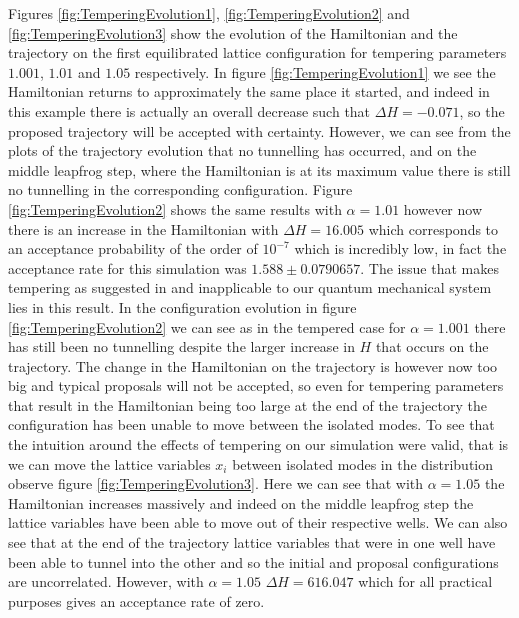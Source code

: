\documentclass[12pt]{article}
\begin{document}
Figures \ref{fig:TemperingEvolution1}, \ref{fig:TemperingEvolution2} and \ref{fig:TemperingEvolution3} show the evolution of the Hamiltonian and the trajectory on the first equilibrated lattice configuration for tempering parameters $1.001$, $1.01$ and $1.05$ respectively. In figure \ref{fig:TemperingEvolution1} we see the Hamiltonian returns to approximately the same place it started, and indeed in this example there is actually an overall decrease such that $\Delta H = -0.071$, so the proposed trajectory will be accepted with certainty. However, we can see from the plots of the trajectory evolution that no tunnelling has occurred, and on the middle leapfrog step, where the Hamiltonian is at its maximum value there is still no tunnelling in the corresponding configuration. Figure \ref{fig:TemperingEvolution2} shows the same results with $\alpha=1.01$ however now there is an increase in the Hamiltonian with $\Delta H = 16.005$ which corresponds to an acceptance probability of the order of $10^{-7}$ which is incredibly low, in fact the acceptance rate for this simulation was $1.588 \pm 0.0790657$. The issue that makes tempering as suggested in \cite{neal_2011} and \cite{neal_1996_b} inapplicable to our quantum mechanical system lies in this result. In the configuration evolution in figure \ref{fig:TemperingEvolution2} we can see as in the tempered case for $\alpha=1.001$ there has still been no tunnelling despite the larger increase in $H$ that occurs on the trajectory. The change in the Hamiltonian on the trajectory is however now too big and typical proposals will not be accepted, so even for tempering parameters that result in the Hamiltonian being too large at the end of the trajectory the configuration has been unable to move between the isolated modes. To see that the intuition around the effects of tempering on our simulation were valid, that is we can move the lattice variables $x_i$ between isolated modes in the distribution observe figure \ref{fig:TemperingEvolution3}. Here we can see that with $\alpha=1.05$ the Hamiltonian increases massively and indeed on the middle leapfrog step the lattice variables have been able to move out of their respective wells. We can also see that at the end of the trajectory lattice variables that were in one well have been able to tunnel into the other and so the initial and proposal configurations are uncorrelated. However, with $\alpha=1.05$ $\Delta H = 616.047$ which for all practical purposes gives an acceptance rate of zero. 
\end{document}
